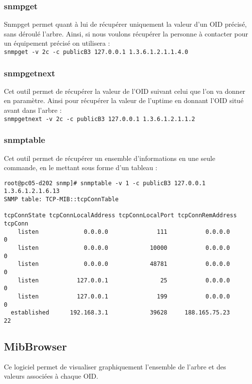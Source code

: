 \documentclass[12pt,a4paper,notitlepage]{article}
\begin{document}
\subsubsection{snmpget}
Snmpget permet quant à lui de récupérer uniquement la valeur d'un OID précisé, sans déroulé l'arbre. Ainsi, si nous voulons récupérer la personne à contacter pour un équipement précisé on utilisera :\\

\noindent \texttt{snmpget -v 2c -c publicB3 127.0.0.1 1.3.6.1.2.1.1.4.0}

\subsubsection{snmpgetnext}
Cet outil permet de récupérer la valeur de l'OID suivant celui que l'on va donner en paramètre. Ainsi pour récupérer la valeur de l'uptime en donnant l'OID situé avant dans l'arbre :\\

\noindent \texttt{snmpgetnext -v 2c -c publicB3 127.0.0.1 1.3.6.1.2.1.1.2}

\subsubsection{snmptable}
Cet outil permet de récupérer un ensemble d'informations en une seule commande, en le mettant sous forme d'un tableau :\\

\begin{lstlisting}[title=Résultat snmptable pour les connexions TCP]
root@pc05-d202 snmp]# snmptable -v 1 -c publicB3 127.0.0.1 1.3.6.1.2.1.6.13
SNMP table: TCP-MIB::tcpConnTable

tcpConnState tcpConnLocalAddress tcpConnLocalPort tcpConnRemAddress tcpConn
    listen             0.0.0.0              111           0.0.0.0        0
    listen             0.0.0.0            10000           0.0.0.0        0
    listen             0.0.0.0            48781           0.0.0.0        0
    listen           127.0.0.1               25           0.0.0.0        0
    listen           127.0.0.1              199           0.0.0.0        0
  established      192.168.3.1            39628     188.165.75.23       22
\end{lstlisting}

\subsection{MibBrowser}
Ce logiciel permet de visualiser graphiquement l'ensemble de l'arbre et des valeurs associées à chaque OID.
\end{document}
